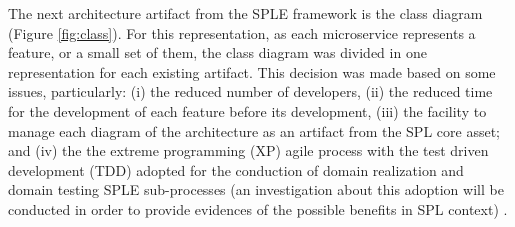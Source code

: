 The next architecture artifact from the SPLE framework is the class diagram (Figure \ref{fig:class}). For this representation, as each microservice represents a feature, or a small set of them, the class diagram was divided in one representation for each existing artifact. This decision was made based on some issues, particularly: (i) the reduced number of developers, (ii) the reduced time for the development of each feature before its development, (iii) the facility to manage each diagram of the architecture as an artifact from the SPL core asset; and (iv) the the extreme programming (XP) agile process \cite{Beck:2004:EPE:1076267} with the test driven development (TDD) \cite{Fraser:2003:TDD:1763875.1763973} adopted for the conduction of domain realization and domain testing SPLE sub-processes (an investigation about this adoption will be conducted in order to provide evidences of the possible benefits in SPL context) .













